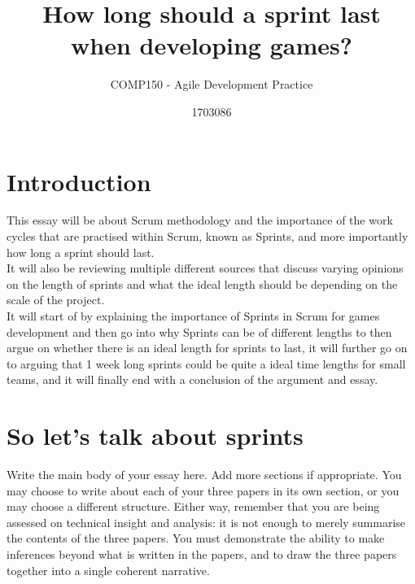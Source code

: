 \documentclass{scrartcl}
\title{How long should a sprint last\\when developing games?}
\subtitle{COMP150 - Agile Development Practice}
\author{1703086}
\begin{document}
\maketitle


\section{Introduction}
\iffalse
Write your introduction here. A brief introduction is recommended, which should outline key details of the chosen topic and the reviewed papers, motivate the work, and provide a roadmap of key points to the reader. The motivation is quite important here, as essays should have a contribution (i.e., what is the point of the essay, and what does the reader take away from the essay) and the link between the motivation (in the introduction) and the contribution (in the conclusion) should be made clear.
\fi
This essay will be about Scrum methodology and the importance of the work cycles that are practised within Scrum, known as Sprints, and more importantly how long a sprint should last.\\
It will also be reviewing multiple different sources that discuss varying opinions on the length of sprints and what the ideal length should be depending on the scale of the project.\\
It will start of by explaining the importance of Sprints in Scrum for games development and then go into why Sprints can be of different lengths to then argue on whether there is an ideal length for sprints to last, it will further go on to arguing that 1 week long sprints could be quite a ideal time lengths for small teams, and it will finally end with a conclusion of the argument and essay.


\section{So let's talk about sprints}
\iffalse
Write the main body of your essay here. Add more sections if appropriate. You may choose to write about each of your three papers in its own section, or you may choose a different structure. Either way, remember that you are being assessed on technical insight and analysis: it is not enough to merely summarise the contents of the three papers. You must demonstrate the ability to make inferences beyond what is written in the papers, and to draw the three papers together into a single coherent narrative.
\end{document}

